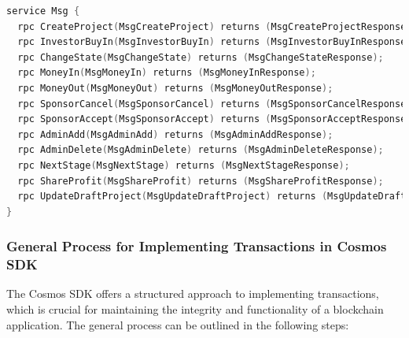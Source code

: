 \begin{lstlisting}[language=go, caption=gRPC endpoints definition,label={lst:gRPC-endpoints}]
service Msg {
  rpc CreateProject(MsgCreateProject) returns (MsgCreateProjectResponse);
  rpc InvestorBuyIn(MsgInvestorBuyIn) returns (MsgInvestorBuyInResponse);
  rpc ChangeState(MsgChangeState) returns (MsgChangeStateResponse);
  rpc MoneyIn(MsgMoneyIn) returns (MsgMoneyInResponse);
  rpc MoneyOut(MsgMoneyOut) returns (MsgMoneyOutResponse);
  rpc SponsorCancel(MsgSponsorCancel) returns (MsgSponsorCancelResponse);
  rpc SponsorAccept(MsgSponsorAccept) returns (MsgSponsorAcceptResponse);
  rpc AdminAdd(MsgAdminAdd) returns (MsgAdminAddResponse);
  rpc AdminDelete(MsgAdminDelete) returns (MsgAdminDeleteResponse);
  rpc NextStage(MsgNextStage) returns (MsgNextStageResponse);
  rpc ShareProfit(MsgShareProfit) returns (MsgShareProfitResponse);
  rpc UpdateDraftProject(MsgUpdateDraftProject) returns (MsgUpdateDraftProjectResponse);
}
\end{lstlisting}

\subsubsection{General Process for Implementing Transactions in Cosmos SDK}

The Cosmos SDK offers a structured approach to implementing transactions, which is crucial for maintaining the integrity and functionality of a blockchain application. The general process can be outlined in the following steps:

